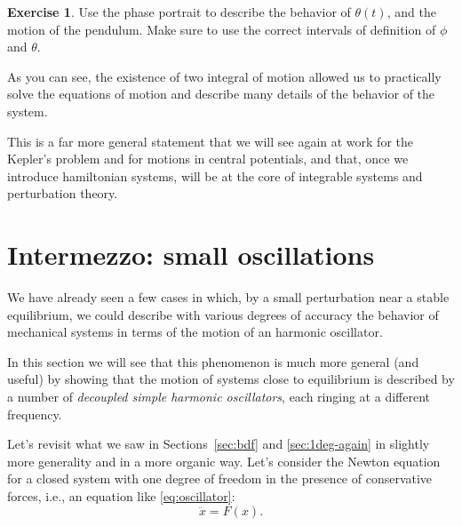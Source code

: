 \documentclass[english,fontsize=11pt,paper=b5]{scrbook}
\numberwithin{equation}{chapter}
\theoremstyle{definition}
\newtheorem{exercise}{Exercise}[chapter]
\begin{document}
    \begin{exercise}
      Use the phase portrait to describe the behavior of $\theta(t)$, and the motion of the pendulum. Make sure to use the correct intervals of definition of $\phi$ and $\theta$.
    \end{exercise}

    As you can see, the existence of two integral of motion allowed us to practically solve the equations of motion and describe many details of the behavior of the system.

    This is a far more general statement that we will see again at work for the Kepler's problem and for motions in central potentials, and that, once we introduce hamiltonian systems, will be at the core of integrable systems and perturbation theory.


    \section{Intermezzo: small oscillations}\label{sec:soc}
    We have already seen a few cases in which, by a small perturbation near a stable equilibrium, we could describe with various degrees of accuracy the behavior of mechanical systems in terms of the motion of an harmonic oscillator.

    In this section we will see that this phenomenon is much more general (and useful) by showing that the motion of systems close to equilibrium is described by a number of \emph{decoupled simple harmonic oscillators}, each ringing at a different frequency.

    Let's revisit what we saw in Sections~\ref{sec:bdf} and \ref{sec:1deg-again} in slightly more generality and in a more organic way. Let's consider the Newton equation for a closed system with one degree of freedom in the presence of conservative forces, i.e., an equation like \eqref{eq:oscillator}:
    \begin{equation}
      \ddot x = F(x).
    \end{equation}
\end{document}
